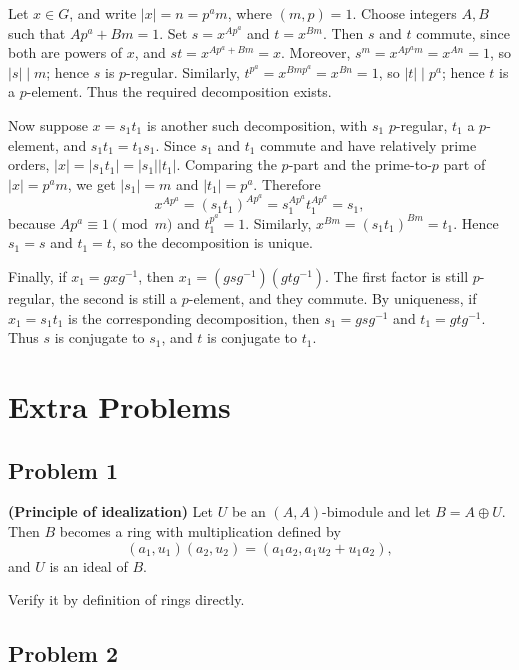 \begin{solution}
Let \(x\in G\), and write \(|x|=n=p^a m\), where \((m,p)=1\). Choose integers
\(A,B\) such that \(Ap^a+Bm=1\). Set \(s=x^{Ap^a}\) and \(t=x^{Bm}\). Then
\(s\) and \(t\) commute, since both are powers of \(x\), and
\(st=x^{Ap^a+Bm}=x\). Moreover, \(s^m=x^{Ap^a m}=x^{An}=1\), so \(|s|\mid m\);
hence \(s\) is \(p\)-regular. Similarly, \(t^{p^a}=x^{Bmp^a}=x^{Bn}=1\), so
\(|t|\mid p^a\); hence \(t\) is a \(p\)-element. Thus the required
decomposition exists.

Now suppose \(x=s_1t_1\) is another such decomposition, with \(s_1\) \(p\)-regular,
\(t_1\) a \(p\)-element, and \(s_1t_1=t_1s_1\). Since \(s_1\) and \(t_1\) commute
and have relatively prime orders, \(|x|=|s_1t_1|=|s_1||t_1|\). Comparing the
\(p\)-part and the prime-to-\(p\) part of \(|x|=p^a m\), we get
\(|s_1|=m\) and \(|t_1|=p^a\). Therefore
\[
x^{Ap^a}=(s_1t_1)^{Ap^a}=s_1^{Ap^a}t_1^{Ap^a}=s_1,
\]
because \(Ap^a\equiv 1\pmod m\) and \(t_1^{p^a}=1\). Similarly,
\(x^{Bm}=(s_1t_1)^{Bm}=t_1\). Hence \(s_1=s\) and \(t_1=t\), so the
decomposition is unique.

Finally, if \(x_1=gxg^{-1}\), then
\(x_1=(gsg^{-1})(gtg^{-1})\). The first factor is still \(p\)-regular, the
second is still a \(p\)-element, and they commute. By uniqueness, if
\(x_1=s_1t_1\) is the corresponding decomposition, then
\(s_1=gsg^{-1}\) and \(t_1=gtg^{-1}\). Thus \(s\) is conjugate to \(s_1\), and
\(t\) is conjugate to \(t_1\).
\end{solution}



\section{Extra Problems}

\subsection{Problem 1}

\textbf{(Principle of idealization)} Let \(U\) be an \((A,A)\)-bimodule and let
\(B=A\oplus U\). Then \(B\) becomes a ring with multiplication defined by
\[
(a_1,u_1)(a_2,u_2)=(a_1a_2,a_1u_2+u_1a_2),
\]
and \(U\) is an ideal of \(B\).
\begin{solution}
    Verify it by definition of rings directly.
\end{solution}
\subsection{Problem 2}

